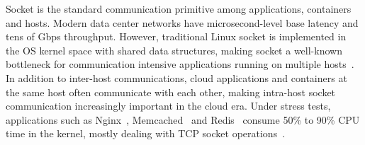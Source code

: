 Socket is the standard communication primitive among applications, containers and hosts.
Modern data center networks have microsecond-level base latency and tens of Gbps throughput. However, traditional Linux socket is implemented in the OS kernel space with shared data structures, making socket a well-known bottleneck for communication intensive applications running on multiple hosts~\cite{barroso2017attack}. In addition to inter-host communications, cloud applications and containers at the same host often communicate with each other, making intra-host socket communication increasingly important in the cloud era. Under stress tests, applications such as Nginx~\cite{reese2008nginx}, Memcached~\cite{fitzpatrick2004distributed} and Redis~\cite{carlson2013redis} consume 50\% to 90\% CPU time in the kernel, mostly dealing with TCP socket operations~\cite{jeong2014mtcp}.

\iffalse
TCP socket in a modern OS typically has three functions:
\begin{ecompact}
	\item Address, locate and connect to another application; %
	\item Provide a reliable and ordered communication channel, identified by an integer \emph{file descriptor} (FD);
	\item Multiplex events from multiple channels， e.g., poll and epoll. Most Linux applications use a readiness-driven I/O multiplexing model. The OS tells application which FDs are ready to receive or send, then the application may prepare buffers and issue receive or send operations.
\end{ecompact}
\fi

